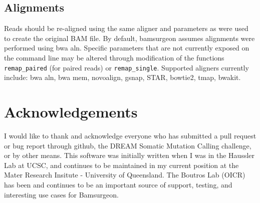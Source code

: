 \documentclass[letterpaper,11pt]{article}
\begin{document}
\subsection{Alignments}
Reads should be re-aligned using the same aligner and parameters as were used to create the original BAM file. By default, bamsurgeon assumes alignments were performed using bwa aln. Specific parameters that are not currently exposed on the command line may be altered through modification of the functions \texttt{remap\_paired} (for paired reads) or \texttt{remap\_single}. Supported aligners currently include: bwa aln, bwa mem, novoalign, gsnap, STAR, bowtie2, tmap, bwakit.

\section{Acknowledgements}
I would like to thank and acknowledge everyone who has submitted a pull request or bug report through github, the DREAM Somatic Mutation Calling challenge, or by other means. This software was initially written when I was in the Haussler Lab at UCSC, and continues to be maintained in my current position at the Mater Research Insitute - University of Queensland. The Boutros Lab (OICR) has been and continues to be an important source of support, testing, and interesting use cases for Bamsurgeon.
\end{document}
